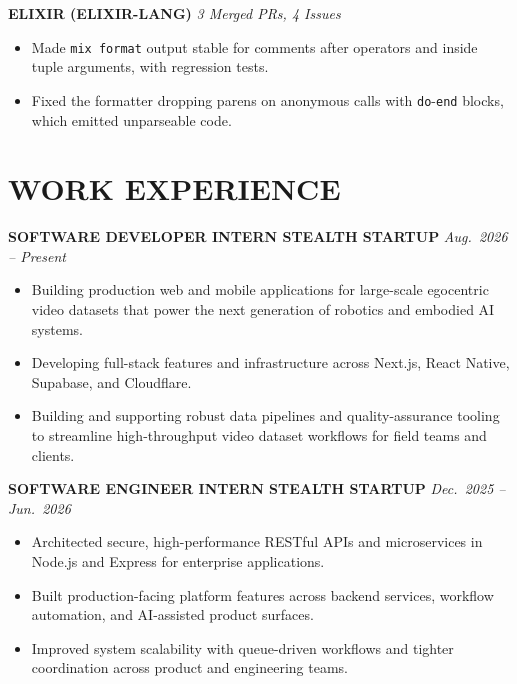\documentclass[letterpaper,9.5pt]{article}
\begin{document}
\vspace{1pt}
\noindent\textbf{ELIXIR (ELIXIR-LANG)} \hfill \textit{3 Merged PRs, 4 Issues}
\begin{itemize}
  \item Made \texttt{mix format} output stable for comments after operators and inside tuple arguments, with regression tests.
  \item Fixed the formatter dropping parens on anonymous calls with \texttt{do}-\texttt{end} blocks, which emitted unparseable code.
\end{itemize}


\section{WORK EXPERIENCE}

\vspace{1pt}
\noindent\textbf{SOFTWARE DEVELOPER INTERN \textbar{} STEALTH STARTUP} \hfill \textit{Aug.\ 2026 -- Present}
\begin{itemize}
  \item Building production web and mobile applications for large-scale egocentric video datasets that power the next generation of robotics and embodied AI systems.
  \item Developing full-stack features and infrastructure across Next.js, React Native, Supabase, and Cloudflare.
  \item Building and supporting robust data pipelines and quality-assurance tooling to streamline high-throughput video dataset workflows for field teams and clients.
\end{itemize}

\vspace{1pt}
\noindent\textbf{SOFTWARE ENGINEER INTERN \textbar{} STEALTH STARTUP} \hfill \textit{Dec.\ 2025 -- Jun.\ 2026}
\begin{itemize}
  \item Architected secure, high-performance RESTful APIs and microservices in Node.js and Express for enterprise applications.
  \item Built production-facing platform features across backend services, workflow automation, and AI-assisted product surfaces.
  \item Improved system scalability with queue-driven workflows and tighter coordination across product and engineering teams.
\end{itemize}


\end{document}
